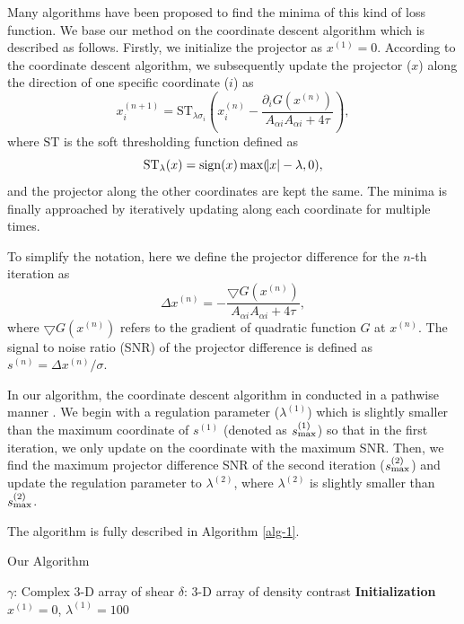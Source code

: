 \documentclass[twocolumn]{aastex62}
\begin{document}
Many algorithms have been proposed to find the minima of this kind of loss function. We base our method on the 
coordinate descent algorithm \citep{coordinateDescent-Wright2015} which is described as follows.
Firstly, we initialize the projector as $x^{(1)}=0$. According to the coordinate descent algorithm, we subsequently 
update the projector ($x$) along the direction of one specific coordinate ($i$) as
\begin{equation}
x^{(n+1)}_{i}=\mathrm{ST}_{\lambda\sigma_{i}} (x^{(n)}_{i} -\frac{\partial_i G(x^{(n)})}{A_{\alpha i}A_{\alpha i}+4\tau}), 
\end{equation}
where $\mathrm{ST}$ is the soft thresholding function defined as
\begin{equation}
\mathrm{ST}_{\lambda} (x) = \mathrm{sign} (x) \max (\abs{x}-\lambda,0),
\end{equation}
and the projector along the other coordinates are kept the same. The minima is finally approached by iteratively updating 
along each coordinate for multiple times. 

To simplify the notation, here we define the projector difference for the $n$-th iteration as
\begin{equation}
 \Delta x ^{(n)} = -\frac{\bigtriangledown G(x^{(n)})}{A_{\alpha i}A_{\alpha i}+4\tau},
\end{equation}
where $\bigtriangledown G(x^{(n)})$ refers to the gradient of quadratic function $G$ at $x^{(n)}$. The signal to noise ratio 
(SNR) of the projector difference is defined as $s^{(n)}=\Delta x ^{(n)}/\sigma$.


In our algorithm, the coordinate descent algorithm in conducted in a pathwise manner \citep{pathwise-Friedman2007}. 
We begin with a regulation parameter 
($\lambda^{(1)}$) which is slightly smaller than the maximum coordinate of $s^{(1)}$ (denoted as $s_{\rm{max}}^{(1)}$) so that 
in the first iteration, we only update on the coordinate with the maximum SNR. Then, we find the maximum projector difference 
SNR of the second iteration ($s_{\rm{max}}^{(2)}$) and update the regulation parameter to $\lambda^{(2)}$, where $\lambda^{(2)}$
is slightly smaller than $s_{\rm{max}}^{(2)}$.

The algorithm is fully described in Algorithm \ref{alg-1}.

\begin{algorithm}[H]
    \label{alg-1}
    \caption{Our Algorithm}
  \begin{algorithmic}[1]
    \INPUT   $\gamma$: Complex $3$-D array of shear
    \OUTPUT  $\delta$: $3$-D array of density contrast
    \STATE \textbf{Initialization} ‎$x^{(1)} = 0$, $\lambda^{(1)} = 100$
      \STATE 
      \STATE 
      \STATE 
      \STATE 
    \ENDWHILE
  \end{algorithmic}
\end{algorithm}
\end{document}
